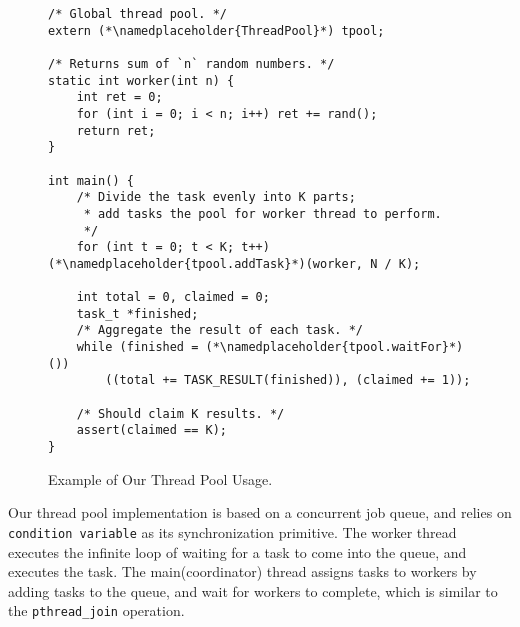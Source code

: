 \begin{figure}[ht]
    \centering
\begin{lstlisting}[frame=tlbr]
/* Global thread pool. */
extern (*\namedplaceholder{ThreadPool}*) tpool;

/* Returns sum of `n` random numbers. */
static int worker(int n) {
    int ret = 0;
    for (int i = 0; i < n; i++) ret += rand();
    return ret;
}

int main() {
    /* Divide the task evenly into K parts; 
     * add tasks the pool for worker thread to perform. 
     */
    for (int t = 0; t < K; t++) (*\namedplaceholder{tpool.addTask}*)(worker, N / K);

    int total = 0, claimed = 0;
    task_t *finished;
    /* Aggregate the result of each task. */
    while (finished = (*\namedplaceholder{tpool.waitFor}*)()) 
        ((total += TASK_RESULT(finished)), (claimed += 1));
    
    /* Should claim K results. */
    assert(claimed == K);
}
\end{lstlisting}
    \caption{Example of Our Thread Pool Usage.}
    \label{code:tpdemo}
\end{figure}

\par Our thread pool implementation is based on a concurrent job queue, and
relies on \texttt{condition variable} as its synchronization primitive\citep{osbook}.
The worker thread executes the infinite loop of waiting for a task to come into
the queue, and
executes the task. The main(coordinator) thread assigns tasks to workers by 
adding tasks to the queue, and wait for workers to complete,
which is similar to the \texttt{pthread\_join} operation.


